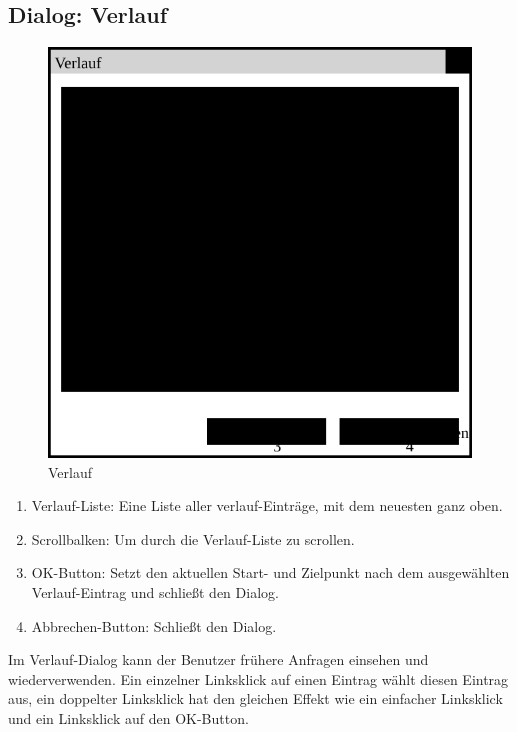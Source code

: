\documentclass[a4paper, 11pt]{article}
\begin{document}
\subsection{Dialog: Verlauf}
\begin{figure}[H]
\centering
\includegraphics[width=0.7\linewidth]{Verlauf}
\caption{Verlauf}
\label{fig:mockupverlauf}
\end{figure}
\begin{enumerate}
\item Verlauf-Liste: Eine Liste aller \gls{verlauf}-Einträge, mit dem neuesten ganz oben.
\item Scrollbalken: Um durch die Verlauf-Liste zu scrollen.
\item OK-Button: Setzt den aktuellen Start- und Zielpunkt nach dem ausgewählten Verlauf-Eintrag und schließt den Dialog.
\item Abbrechen-Button: Schließt den Dialog.
\end{enumerate}

Im Verlauf-Dialog kann der Benutzer frühere Anfragen einsehen und wiederverwenden. Ein einzelner Linksklick auf einen Eintrag wählt diesen Eintrag aus, ein doppelter Linksklick hat den gleichen Effekt wie ein einfacher Linksklick und ein Linksklick auf den OK-Button.
\end{document}
